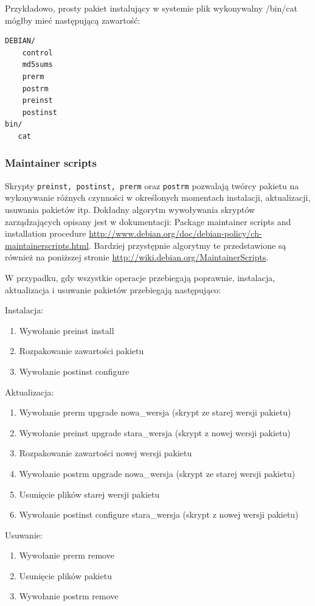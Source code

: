 \documentclass[polish,12pt]{aghthesis}
\begin{document}
Przykładowo, prosty pakiet instalujący w systemie plik wykonywalny /bin/cat mógłby mieć następującą zawartość:

\begin{verbatim}
DEBIAN/
    control
    md5sums
    prerm
    postrm
    preinst
    postinst
bin/
   cat
\end{verbatim}

\subsubsection{Maintainer scripts}
Skrypty \texttt{preinst, postinst, prerm} oraz \texttt{postrm} pozwalają twórcy pakietu na wykonywanie różnych czynności w określonych momentach instalacji, aktualizacji, usuwania pakietów itp. Dokładny algorytm wywoływania skryptów zarządzających opisany jest w dokumentacji: Package maintainer scripts and installation procedure \url{http://www.debian.org/doc/debian-policy/ch-maintainerscripts.html}. Bardziej przystępnie algorytmy te przedstawione są również na poniższej stronie \url{http://wiki.debian.org/MaintainerScripts}.

W przypadku, gdy wszystkie operacje przebiegają poprawnie, instalacja, aktualizacja i usuwanie pakietów przebiegają następująco:

Instalacja:
\begin{enumerate}
\item Wywołanie preinst install
\item Rozpakowanie zawartości pakietu
\item Wywołanie postinst configure
\end{enumerate}
Aktualizacja:
\begin{enumerate}
\item Wywołanie prerm upgrade nowa\_wersja (skrypt ze starej wersji pakietu)
\item Wywołanie preinst upgrade stara\_wersja (skrypt z nowej wersji pakietu)
\item Rozpakowanie zawartości nowej wersji pakietu
\item Wywołanie postrm upgrade nowa\_wersja (skrypt ze starej wersji pakietu)
\item Usunięcie plików starej wersji pakietu
\item Wywołanie postinst configure stara\_wersja (skrypt z nowej wersji pakietu)
\end{enumerate}
Usuwanie:
\begin{enumerate}
\item Wywołanie prerm remove
\item Usunięcie plików pakietu
\item Wywołanie postrm remove
\end{enumerate}
\end{document}
